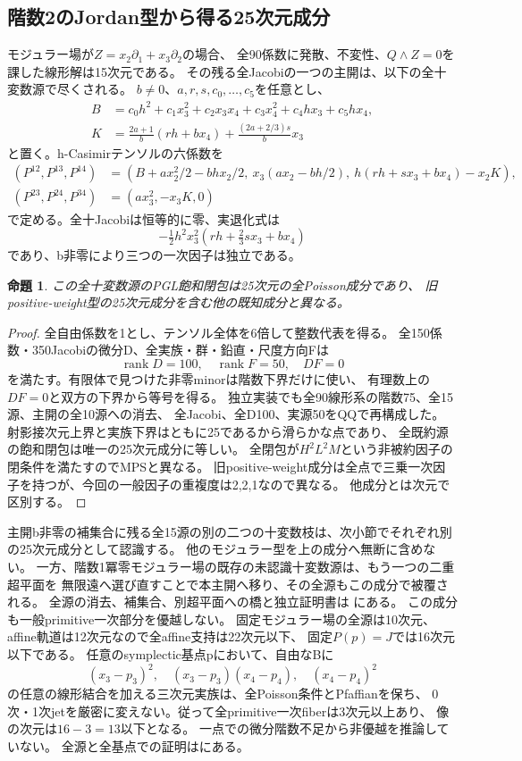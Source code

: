 \documentclass[a4paper,11pt]{ltjsarticle}
\newtheorem{proposition}{命題}[section]
\theoremstyle{definition}
\begin{document}
\subsection{階数2のJordan型から得る25次元成分}
モジュラー場が$Z=x_2\partial_1+x_3\partial_2$の場合、
全90係数に発散、不変性、$Q\wedge Z=0$を課した線形解は15次元である。
その残る全Jacobiの一つの主開は、以下の全十変数源で尽くされる。
$b\ne0$、$a,r,s,c_0,\ldots,c_5$を任意とし、
\[
 \begin{split}
 B&=c_0h^2+c_1x_3^2+c_2x_3x_4+c_3x_4^2+c_4hx_3+c_5hx_4,\\
 K&=\frac{2a+1}{b}(rh+bx_4)+\frac{(2a+2/3)s}{b}x_3
 \end{split}
\]
と置く。h-Casimirテンソルの六係数を
\[
 \begin{split}
 (P^{12},P^{13},P^{14})&=
 (B+ax_2^2/2-bhx_2/2,\ x_3(ax_2-bh/2),\ h(rh+sx_3+bx_4)-x_2K),\\
 (P^{23},P^{24},P^{34})&=(ax_3^2,-x_3K,0)
 \end{split}
\]
で定める。全十Jacobiは恒等的に零、実退化式は
\[
 -\tfrac12h^2x_3^2(rh+\tfrac23sx_3+bx_4)
\]
であり、b非零により三つの一次因子は独立である。

\begin{proposition}\label{prop:nil31-component}
この全十変数源のPGL飽和閉包は25次元の全Poisson成分であり、
旧positive-weight型の25次元成分を含む他の既知成分と異なる。
\end{proposition}
\begin{proof}
全自由係数を1とし、テンソル全体を6倍して整数代表を得る。
全150係数・350Jacobiの微分D、全実族・群・鉛直・尺度方向Fは
\[
 \operatorname{rank}D=100,\quad\operatorname{rank}F=50,\quad DF=0
\]
を満たす。有限体で見つけた非零minorは階数下界だけに使い、
有理数上の$DF=0$と双方の下界から等号を得る。
独立実装でも全90線形系の階数75、全15源、主開の全10源への消去、
全Jacobi、全D100、実源50をQQで再構成した。
射影接次元上界と実族下界はともに25であるから滑らかな点であり、
全既約源の飽和閉包は唯一の25次元成分に等しい。
全閉包が$H^2L^2M$という非被約因子の閉条件を満たすのでMPSと異なる。
旧positive-weight成分は全点で三乗一次因子を持つが、今回の一般因子の重複度は2,2,1なので異なる。
他成分とは次元で区別する。
\end{proof}

主開b非零の補集合に残る全15源の別の二つの十変数枝は、次小節でそれぞれ別の25次元成分として認識する。
他のモジュラー型を上の成分へ無断に含めない。
一方、階数1冪零モジュラー場の既存の未認識十変数源は、もう一つの二重超平面を
無限遠へ選び直すことで本主開へ移り、その全源もこの成分で被覆される。
全源の消去、補集合、別超平面への橋と独立証明書は
にある。
この成分も一般primitive一次部分を優越しない。
固定モジュラー場の全源は10次元、affine軌道は12次元なので全affine支持は22次元以下、
固定$P(p)=J$では16次元以下である。
任意のsymplectic基点pにおいて、自由なBに
\[
 (x_3-p_3)^2,\quad(x_3-p_3)(x_4-p_4),\quad(x_4-p_4)^2
\]
の任意の線形結合を加える三次元実族は、全Poisson条件とPfaffianを保ち、
0次・1次jetを厳密に変えない。従って全primitive一次fiberは3次元以上あり、
像の次元は$16-3=13$以下となる。
一点での微分階数不足から非優越を推論していない。
全源と全基点での証明はにある。
\end{document}

